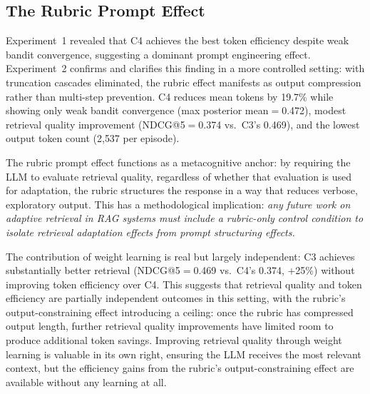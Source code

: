

\subsection{The Rubric Prompt Effect}
\label{sec:confound}

Experiment~1 revealed that C4 achieves the best token efficiency despite weak bandit convergence, suggesting a dominant prompt engineering effect.
Experiment~2 confirms and clarifies this finding in a more controlled setting: with truncation cascades eliminated, the rubric effect manifests as output compression rather than multi-step prevention.
C4 reduces mean tokens by 19.7\% while showing only weak bandit convergence (max posterior mean${=}$0.472), modest retrieval quality improvement (NDCG@5${=}$0.374 vs.\ C3's 0.469), and the lowest output token count (2{,}537 per episode).

The rubric prompt effect functions as a metacognitive anchor: by requiring the LLM to evaluate retrieval quality, regardless of whether that evaluation is used for adaptation, the rubric structures the response in a way that reduces verbose, exploratory output.
This has a methodological implication: \emph{any future work on adaptive retrieval in RAG systems must include a rubric-only control condition to isolate retrieval adaptation effects from prompt structuring effects.}

The contribution of weight learning is real but largely independent: C3 achieves substantially better retrieval (NDCG@5${=}$0.469 vs.\ C4's 0.374, $+$25\%) without improving token efficiency over C4.
This suggests that retrieval quality and token efficiency are partially independent outcomes in this setting, with the rubric's output-constraining effect introducing a ceiling: once the rubric has compressed output length, further retrieval quality improvements have limited room to produce additional token savings.
Improving retrieval quality through weight learning is valuable in its own right, ensuring the LLM receives the most relevant context, but the efficiency gains from the rubric's output-constraining effect are available without any learning at all.
